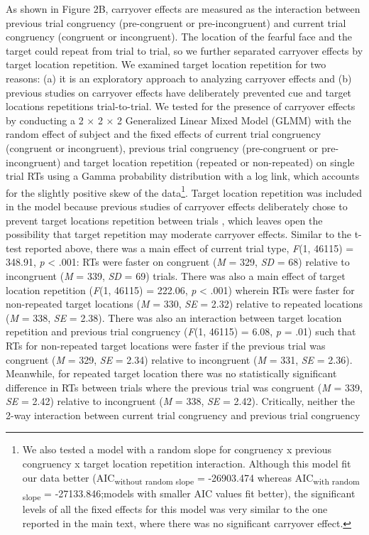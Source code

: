 \documentclass{article}
\begin{document}
	As shown in Figure 2B, carryover effects are measured as the interaction between previous trial congruency (pre-congruent or pre-incongruent) and current trial congruency (congruent or incongruent). The location of the fearful face and the target could repeat from trial to trial, so we further separated carryover effects by target location repetition. {\color{4472C4}We examined target location repetition for two reasons: (a) it is an exploratory approach to analyzing carryover effects and (b) previous studies on carryover effects }\textcite{[object Object]}{\color{4472C4} have deliberately prevented cue and target locations repetitions trial-to-trial. }We tested for the presence of carryover effects by conducting a 2 × 2 × 2 Generalized Linear Mixed Model (GLMM) {\color{4472C4}with the random effect of subject} and the fixed effects of current trial congruency (congruent or incongruent), previous trial congruency (pre-congruent or pre-incongruent) and target location repetition (repeated or non-repeated) on {\color{4472C4}single trial} RTs using a Gamma probability distribution with a log link, which accounts for the slightly positive skew of the data\footnote{{\color{4472C4} We also tested a model with a random slope for congruency x previous congruency x target location repetition interaction. }{\color{4472C4}Although this model fit our data better (AIC}\textsubscript{{\color{4472C4}without random slope}}{\color{4472C4} = -26903.474 whereas AIC}\textsubscript{{\color{4472C4}with random slope}}{\color{4472C4} = -27133.846;models with smaller AIC values fit better), the significant levels of all the fixed effects for this model was very similar to the one reported in the main text, where there was no significant carryover effect.}}. Target location repetition was included in the model because previous studies of carryover effects deliberately chose to prevent target locations repetition between trials \textcite{[object Object]}, which leaves open the possibility that target repetition may moderate carryover effects. Similar to the t-test reported above, there was a main effect of current trial type, \emph{F}(1, 46115) = 348.91, \emph{p }< .001: RTs were faster on congruent (\emph{M }= 329, \emph{SD}\emph{ }= 68) relative to incongruent (\emph{M }= 339, \emph{SD }= 69) trials. There was also a main effect of target location repetition (\emph{F}(1, 46115) = 222.06, \emph{p }< .001) wherein RTs were faster for non-repeated target locations ({\color{4472C4}\emph{M}}\emph{ }= 330, \emph{SE }= 2.32) relative to repeated locations ({\color{4472C4}\emph{M}}\emph{ }= 338, \emph{SE }= 2.38). There was also an interaction between target location repetition and previous trial congruency (\emph{F}(1, 46115) = 6.08, \emph{p }= .01) such that RTs for non-repeated target locations were faster if the previous trial was congruent (\emph{M }= 329, \emph{SE }= 2.34) relative to incongruent (\emph{M }= 331, \emph{SE }= 2.36). Meanwhile, for repeated target location there was {\color{4472C4}no statistically significant difference }in RTs between trials where the previous trial was congruent (\emph{M }= 339, \emph{SE }= 2.42) relative to incongruent (\emph{M }= 338, \emph{SE }= 2.42). Critically, neither the 2-way interaction between current trial congruency and previous trial congruency 
\end{document}
